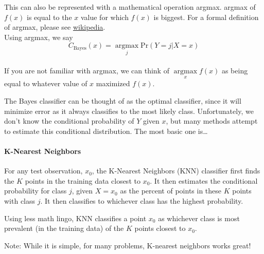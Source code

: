 \begin{aside}
    This can also be represented with a mathematical operation    argmax.  argmax of \(f(x)\) is equal to the \(x\) value
    for which \(f(x)\) is biggest. For a formal definition of argmax,
    please see \href{https://en.wikipedia.org/wiki/Arg_max}{wikipedia}.\\
    Using argmax, we say
    \begin{equation*}
        C_{\text{Bayes}} (x) = \underset{j}{\operatorname{argmax}} \text{Pr}(Y=j | X=x)
    \end{equation*}\\
    If you are not familiar with argmax, we can think of \(\underset{x}{\operatorname{argmax}} f(x)\) as being equal to whatever value
    of \(x\) maximized \(f(x)\).
\end{aside}

The Bayes classifier can be thought of as the optimal classifier, since it will minimize error as it always 
classifies to the most likely class. Unfortunately, we don't know the conditional probability of \(Y\) given
\(x\), but many methods attempt to estimate this conditional distribution. The most basic one is\ldots{}

\paragraph{K-Nearest Neighbors\\}
For any test observation, \(x_0\), the K-Nearest Neighbors (KNN)
classifier first finds the \(K\) points in the training data closest to
\(x_0\). It then estimates the conditional probability for class \(j\),
given \(X=x_0\) as the percent of points in these \(K\) points with
class \(j\). It then classifies to whichever class has the highest
probability.

Using less math lingo, KNN classifies a point \(x_0\) as whichever class
is most prevalent (in the training data) of the \(K\) points closest to
\(x_0\).

Note: While it is simple, for many problems, K-nearest neighbors works
great!
